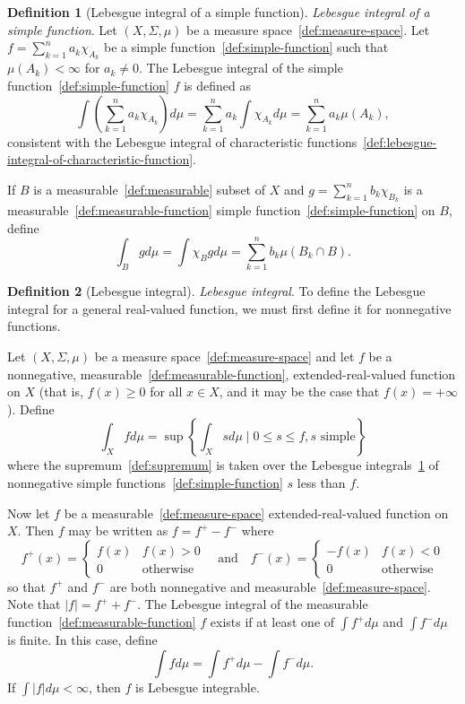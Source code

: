 \documentclass[12pt,a4paper]{article}
\theoremstyle{definition}
\newtheorem{definition}{Definition}
\begin{document}
\begin{definition}[Lebesgue integral of a simple function]\label{def:lebesgue-integral-of-a-simple-function}
\emph{Lebesgue integral of a simple function}. Let $(X,\Sigma, \mu)$ be a measure space~\ref{def:measure-space}. Let $f = \sum\limits_{k=1}^n a_k \chi_{A_k}$ be a simple function~\ref{def:simple-function} such that $\mu(A_k) < \infty$ for $a_k \neq 0$.  The Lebesgue integral of the simple function~\ref{def:simple-function} $f$ is defined as $$\int\left(\sum_{k=1}^n a_k\chi_{A_k}\right)d\mu = \sum_{k=1}^n a_k \int\chi_{A_k}d\mu = \sum_{k=1}^n a_k\mu(A_k),$$ consistent with the Lebesgue integral of characteristic functions~\ref{def:lebesgue-integral-of-characteristic-function}.

If $B$ is a measurable~\ref{def:measurable} subset of $X$ and $g = \sum\limits_{k=1}^n b_k\chi_{B_k}$ is a measurable~\ref{def:measurable-function} simple function~\ref{def:simple-function} on $B$, define $$\int_B gd\mu = \int\chi_Bgd\mu = \sum_{k=1}^nb_k\mu(B_k\cap B).$$
\end{definition}

\begin{definition}[Lebesgue integral]\label{def:lebesgue-integral}
\emph{Lebesgue integral}. To define the Lebesgue integral for a general real-valued function, we must first define it for nonnegative functions.

Let $(X,\Sigma,\mu)$ be a measure space~\ref{def:measure-space} and let $f$ be a nonnegative, measurable~\ref{def:measurable-function}, extended-real-valued function on $X$ (that is, $f(x) \geq 0$ for all $x \in X$, and it may be the case that $f(x) = +\infty$). Define $$\int_X fd\mu = \sup\left\{\int_X sd\mu \mid 0\leq s\leq f, s \text{ simple}\right\}$$ where the supremum~\ref{def:supremum} is taken over the Lebesgue integrals~\ref{def:lebesgue-integral-of-a-simple-function} of nonnegative simple functions~\ref{def:simple-function} $s$ less than $f$.

Now let $f$ be a measurable~\ref{def:measure-space} extended-real-valued function on $X$. Then $f$ may be written as $f = f^+ - f^-$ where $$f^+(x) =\begin{cases}f(x) & f(x)>0 \\0 &\text{otherwise} \end{cases} \quad\text{and}\quad f^-(x) = \begin{cases}-f(x) & f(x)<0 \\ 0 &\text{otherwise} \end{cases}$$ so that $f^+$ and $f^-$ are both nonnegative and measurable~\ref{def:measure-space}. Note that $\vert f\vert  = f^+ + f^-$. The Lebesgue integral of the measurable function~\ref{def:measurable-function} $f$ exists if at least one of $\int f^+d\mu$ and $\int f^- d\mu$ is finite. In this case, define $$\int f d\mu = \int f^+d\mu - \int f^-d\mu.$$ If $\int\vert f\vert d\mu < \infty$, then $f$ is Lebesgue integrable.
\end{definition}
\end{document}
